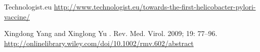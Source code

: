 \documentclass[11pt]{beamer}
\begin{document}
\begin{frame}[allowframebreaks]
\begin{thebibliography}{10}
       \beamertemplateonlinebibitems
  Technologist.eu
    \newblock \url{http://www.technologist.eu/towards-the-first-helicobacter-pylori-vaccine/}     
    
  \beamertemplatearticlebibitems
    Xingdong Yang and Xinglong Yu
    .
    \newblock Rev. Med. Virol. 2009; 19: 77–96.
    \newblock \url{http://onlinelibrary.wiley.com/doi/10.1002/rmv.602/abstract}

  \end{thebibliography}
\end{frame}
\end{document}
